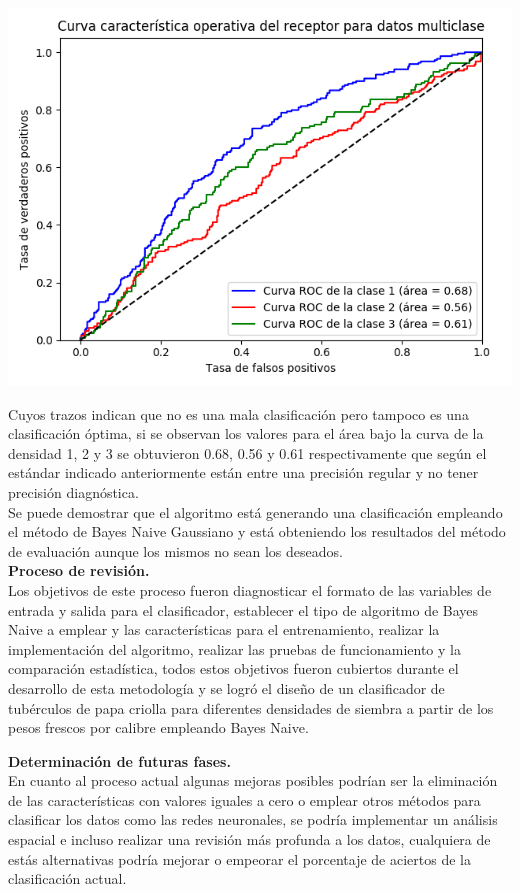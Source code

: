 \begin{center}
	\includegraphics[scale=0.6]{roc.png}
\end{center}

Cuyos trazos indican que no es una mala clasificación pero tampoco es una clasificación
óptima, si se observan los valores para el área bajo la curva de la densidad 1, 2 y 3
se obtuvieron 0.68, 0.56 y 0.61 respectivamente que según el estándar indicado anteriormente
están entre una precisión regular y no tener precisión diagnóstica.\\

Se puede demostrar que el algoritmo está generando una clasificación empleando el método de Bayes Naive Gaussiano
y está obteniendo los resultados del método de evaluación aunque los mismos no sean los deseados.\\

\noindent
\textbf{Proceso de revisión.}\\

Los objetivos de este proceso fueron diagnosticar el formato de las
variables de entrada y salida para el clasificador, establecer el tipo de
algoritmo de Bayes Naive a emplear y las características para el entrenamiento,
realizar la implementación del algoritmo, realizar las pruebas de funcionamiento
y la comparación estadística, todos estos objetivos fueron cubiertos durante el
desarrollo de esta metodología y se logró el diseño de un clasificador de tubérculos
de papa criolla para diferentes densidades de siembra a partir de los pesos frescos
por calibre empleando Bayes Naive.

\noindent
\textbf{Determinación de futuras fases.}\\

En cuanto al proceso actual algunas mejoras posibles podrían ser la eliminación
de las características con valores iguales a cero o emplear otros métodos para
clasificar los datos como las redes neuronales, se podría implementar un análisis
espacial e incluso realizar una revisión más profunda a los datos, cualquiera de
estás alternativas podría mejorar o empeorar el porcentaje de aciertos de la clasificación actual.\\